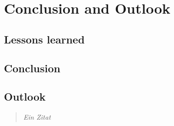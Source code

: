 \chapter{Conclusion and Outlook}\label{conclusion_outlook}
\section{Lessons learned}\label{lessons_learned}
\section{Conclusion}\label{conclusion}
\section{Outlook}\label{outlook}	
	
		
		
		\begin{quote}
			\textit{Ein Zitat}
		\end{quote}


				\autocite[20]{}


\newpage






